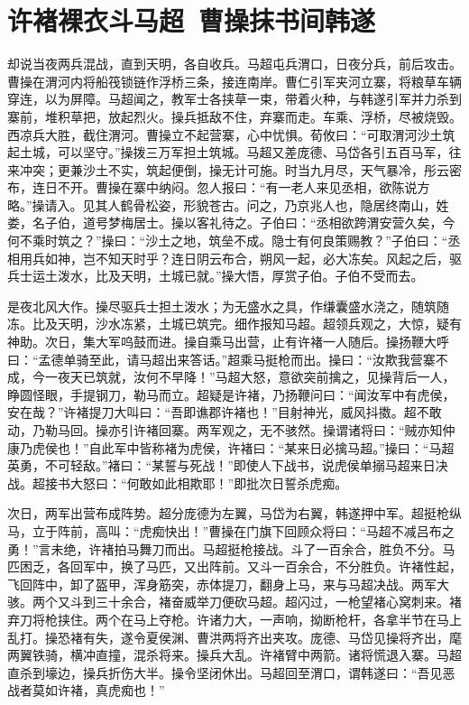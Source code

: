 \chapter{许褚裸衣斗马超~曹操抹书间韩遂}

却说当夜两兵混战，直到天明，各自收兵。马超屯兵渭口，日夜分兵，前后攻击。曹操在渭河内将船筏锁链作浮桥三条，接连南岸。曹仁引军夹河立寨，将粮草车辆穿连，以为屏障。马超闻之，教军士各挟草一束，带着火种，与韩遂引军并力杀到寨前，堆积草把，放起烈火。操兵抵敌不住，弃寨而走。车乘、浮桥，尽被烧毁。西凉兵大胜，截住渭河。曹操立不起营寨，心中忧惧。荀攸曰：“可取渭河沙土筑起土城，可以坚守。”操拨三万军担土筑城。马超又差庞德、马岱各引五百马军，往来冲突；更兼沙土不实，筑起便倒，操无计可施。时当九月尽，天气暴冷，彤云密布，连日不开。曹操在寨中纳闷。忽人报曰：“有一老人来见丞相，欲陈说方略。”操请入。见其人鹤骨松姿，形貌苍古。问之，乃京兆人也，隐居终南山，姓娄，名子伯，道号梦梅居士。操以客礼待之。子伯曰：“丞相欲跨渭安营久矣，今何不乘时筑之？”操曰：“沙土之地，筑垒不成。隐士有何良策赐教？”子伯曰：“丞相用兵如神，岂不知天时乎？连日阴云布合，朔风一起，必大冻矣。风起之后，驱兵士运土泼水，比及天明，土城已就。”操大悟，厚赏子伯。子伯不受而去。

是夜北风大作。操尽驱兵士担土泼水；为无盛水之具，作缣囊盛水浇之，随筑随冻。比及天明，沙水冻紧，土城已筑完。细作报知马超。超领兵观之，大惊，疑有神助。次日，集大军呜鼓而进。操自乘马出营，止有许褚一人随后。操扬鞭大呼曰：“孟德单骑至此，请马超出来答话。”超乘马挺枪而出。操曰：“汝欺我营寨不成，今一夜天已筑就，汝何不早降！”马超大怒，意欲突前擒之，见操背后一人，睁圆怪眼，手提钢刀，勒马而立。超疑是许褚，乃扬鞭问曰：“闻汝军中有虎侯，安在哉？”许褚提刀大叫曰：“吾即谯郡许褚也！”目射神光，威风抖擞。超不敢动，乃勒马回。操亦引许褚回寨。两军观之，无不骇然。操谓诸将曰：“贼亦知仲康乃虎侯也！”自此军中皆称褚为虎侯，许褚曰：“某来日必擒马超。”操曰：“马超英勇，不可轻敌。”褚曰：“某誓与死战！”即使人下战书，说虎侯单搦马超来日决战。超接书大怒曰：“何敢如此相欺耶！”即批次日誓杀虎痴。

次日，两军出营布成阵势。超分庞德为左翼，马岱为右翼，韩遂押中军。超挺枪纵马，立于阵前，高叫：“虎痴快出！”曹操在门旗下回顾众将曰：“马超不减吕布之勇！”言未绝，许褚拍马舞刀而出。马超挺枪接战。斗了一百余合，胜负不分。马匹困乏，各回军中，换了马匹，又出阵前。又斗一百余合，不分胜负。许褚性起，飞回阵中，卸了盔甲，浑身筋突，赤体提刀，翻身上马，来与马超决战。两军大骇。两个又斗到三十余合，褚奋威举刀便砍马超。超闪过，一枪望褚心窝刺来。褚弃刀将枪挟住。两个在马上夺枪。许诸力大，一声响，拗断枪杆，各拿半节在马上乱打。操恐褚有失，遂令夏侯渊、曹洪两将齐出夹攻。庞德、马岱见操将齐出，麾两翼铁骑，横冲直撞，混杀将来。操兵大乱。许褚臂中两箭。诸将慌退入寨。马超直杀到壕边，操兵折伤大半。操令坚闭休出。马超回至渭口，谓韩遂曰：“吾见恶战者莫如许褚，真虎痴也！”

